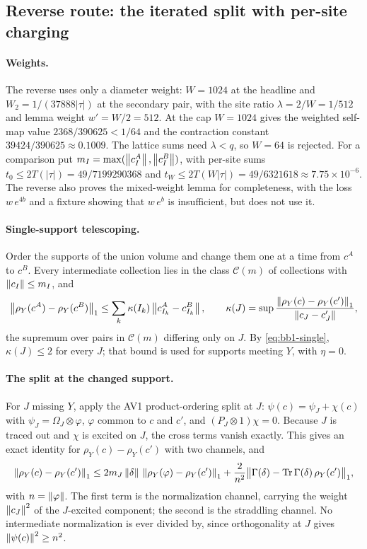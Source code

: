 \subsection{Reverse route: the iterated split with per-site charging}
\label{sec:bb1-reverse}
\paragraph{Weights.} The reverse uses only a diameter weight: $W=1024$ at the
headline and $W_2=1/(37888|\tau|)$ at the secondary pair, with the site ratio
$\lambda=2/W=1/512$ and lemma weight $w'=W/2=512$. At the cap $W=1024$ gives
the weighted self-map value $2368/390625<1/64$ and the contraction constant
$39424/390625\approx0.1009$. The lattice sums need $\lambda<q$, so $W=64$ is
rejected. For a comparison put $m_I=\max(\left\lVert c^A_I\right\rVert,\left\lVert c^B_I\right\rVert)$, with
per-site sums $t_0\le2T(|\tau|)=49/7199290368$ and
$t_W\le2T(W|\tau|)=49/6321618\approx7.75\times10^{-6}$. The reverse also proves
the mixed-weight lemma for completeness, with the loss $w\,e^{4b}$ and a
fixture showing that $w\,e^b$ is insufficient, but does not use it.

\paragraph{Single-support telescoping.} Order the supports of the union volume
and change them one at a time from $c^A$ to $c^B$. Every intermediate
collection lies in the class $\mathcal C(m)$ of collections with
$\left\lVert c_I\right\rVert\le m_I$, and
\begin{equation}
 \left\lVert\rho_Y(c^A)-\rho_Y(c^B)\right\rVert_1\le\sum_k\kappa(I_k)\left\lVert c^A_{I_k}-c^B_{I_k}\right\rVert,\qquad
 \kappa(J)=\sup\frac{\left\lVert\rho_Y(c)-\rho_Y(c')\right\rVert_1}{\left\lVert c_J-c'_J\right\rVert},
 \label{eq:bb1-telescoping}
\end{equation}
the supremum over pairs in $\mathcal C(m)$ differing only on $J$. By
\eqref{eq:bb1-single}, $\kappa(J)\le2$ for every $J$; that bound is used for
supports meeting $Y$, with $\eta=0$.

\paragraph{The split at the changed support.} For $J$ missing $Y$, apply the
AV1 product-ordering split at $J$: $\psi(c)=\psi_J+\chi(c)$ with
$\psi_J=\Omega_J\otimes\varphi$, $\varphi$ common to $c$ and $c'$, and
$(P_J\otimes1)\chi=0$. Because $J$ is traced out and $\chi$ is excited on
$J$, the cross terms vanish exactly. This gives an exact identity for
$\rho_Y(c)-\rho_Y(c')$ with two channels, and
\begin{equation}
 \left\lVert\rho_Y(c)-\rho_Y(c')\right\rVert_1\le2m_J\left\lVert\delta\right\rVert\,\left\lVert\rho_Y(\varphi)-\rho_Y(c')\right\rVert_1
 +\frac2{n^2}\bigl\|\Gamma(\delta)-\operatorname{Tr}\Gamma(\delta)\,\rho_Y(c')\bigr\|_1,
 \label{eq:bb1-split}
\end{equation}
with $n=\left\lVert\varphi\right\rVert$. The first term is the normalization channel, carrying
the weight $\left\lVert c_J\right\rVert^2$ of the $J$-excited component; the second is the
straddling channel. No intermediate normalization is ever divided by, since
orthogonality at $J$ gives $\left\lVert\psi(c)\right\rVert^2\ge n^2$.

